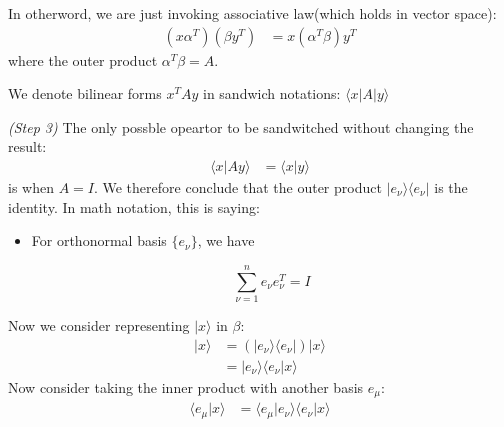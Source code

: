 \begin{framed}
In otherword, we are just invoking associative law(which holds in vector space):
\begin{equation}
\begin{aligned}
(x\alpha^T) (\beta y^T)&=x(\alpha^T \beta) y^T
\end{aligned}
\end{equation}
where the outer product $\alpha^T \beta=A$.

We denote bilinear forms $x^TAy$ in sandwich notations: $\langle x |A|y\rangle$

\textit{(Step 3)} The only possble opeartor to be sandwitched without changing the result:
\begin{equation}
\begin{aligned}
\langle x|Ay\rangle &= \langle x | y\rangle
\end{aligned}
\end{equation}
is when $A=I$. We therefore conclude that the outer product $|e_{\nu}\rangle \langle e_{\nu}|$ is the identity. In math notation, this is saying:

\begin{itemize}
\item For orthonormal basis $\{e_{\nu}\}$, we have

\begin{equation}
\sum_{\nu=1}^n e_{\nu}e_{\nu}^T=I
\end{equation}
\end{itemize}
\end{framed}

Now we consider representing $|x\rangle$ in $\beta$:
\begin{equation}
\begin{aligned}
|x\rangle &= (|e_{\nu} \rangle \langle e_{\nu}|) |x\rangle \\
&= |e_{\nu}\rangle \langle e_{\nu}|x\rangle
\end{aligned}
\end{equation}
Now consider taking the inner product with another basis $e_{\mu}$:
\begin{equation}
\begin{aligned}
\langle e_{\mu}|x\rangle  &=\langle e_{\mu}|e_{\nu}\rangle \langle e_{\nu}|x\rangle
\end{aligned}
\end{equation}